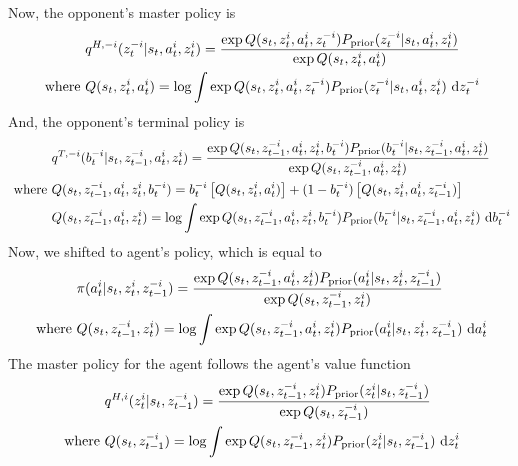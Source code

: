 Now, the opponent's master policy is 
\begin{equation}
\begin{aligned}
    &q^{H, -i}(z_t^{-i} | s_t, a^i_t, z^i_t) = \frac{\exp Q(s_t, z^i_t, a^{i}_t, z^{-i}_t) P_{\text{prior}}(z_t^{-i} | s_t, a^i_t, z^i_t)}{\exp Q(s_t, z^i_t, a^{i}_t)} \\
    \text{ where }& Q(s_t, z^i_t, a^{i}_t) = \log \int \exp Q(s_t, z^i_t, a^{i}_t, z^{-i}_t) P_{\text{prior}}(z_t^{-i} | s_t, a^i_t, z^i_t) \ \mathrm{d} z^{-i}_t
\end{aligned}
\end{equation}
And, the opponent's terminal policy is 
\begin{equation}
\begin{aligned}
    &q^{T,-i}(b^{-i}_t | s_t,  z^{-i}_{t-1}, a^i_t, z^i_t) = \frac{\exp Q(s_t,  z^{-i}_{t-1}, a^i_t, z^i_t, b^{-i}_t) P_{\text{prior}}(b^{-i}_t | s_t,  z^{-i}_{t-1}, a^i_t, z^i_t)}{\exp Q(s_t,  z^{-i}_{t-1}, a^i_t, z^i_t)} \\
    \text{ where }&Q(s_t,  z^{-i}_{t-1}, a^i_t, z^i_t, b^{-i}_t) = b^{-i}_t\left[ Q(s_t, z^i_t, a^{i}_t) \right] + (1-b^{-i}_t)\left[ Q(s_t, z^i_t, a^{i}_t, z^{-i}_{t-1}) \right] \\
    &Q(s_t,  z^{-i}_{t-1}, a^i_t, z^i_t) = \log \int \exp Q(s_t,  z^{-i}_{t-1}, a^i_t, z^i_t, b^{-i}_t) P_{\text{prior}}(b^{-i}_t | s_t,  z^{-i}_{t-1}, a^i_t, z^i_t) \ \mathrm{d} b^{-i}_t
\end{aligned}
\end{equation}
Now, we shifted to agent's policy, which is equal to 
\begin{equation}
\begin{aligned}
    &\pi(a^i_t | s_t, z^i_t, z^{-i}_{t-1}) = \frac{\exp Q(s_t,  z^{-i}_{t-1}, a^i_t, z^i_t) P_{\text{prior}}(a^i_t | s_t, z^i_t, z^{-i}_{t-1})}{\exp Q(s_t,  z^{-i}_{t-1}, z^i_t)} \\
    \text{ where }&Q(s_t,  z^{-i}_{t-1}, z^i_t) = \log \int \exp Q(s_t,  z^{-i}_{t-1}, a^i_t, z^i_t) P_{\text{prior}}(a^i_t | s_t, z^i_t, z^{-i}_{t-1}) \ \mathrm{d} a^i_t
\end{aligned}
\end{equation}
The master policy for the agent follows the agent's value function
\begin{equation}
\begin{aligned}
    &q^{H, i}(z_t^i | s_t, z^{-i}_{t-1}) = \frac{\exp Q(s_t,  z^{-i}_{t-1}, z^i_t) P_{\text{prior}}(z_t^i | s_t, z^{-i}_{t-1})}{\exp Q(s_t,  z^{-i}_{t-1})} \\
    \text{ where }&Q(s_t,  z^{-i}_{t-1}) = \log \int\exp Q(s_t,  z^{-i}_{t-1}, z^i_t) P_{\text{prior}}(z_t^i | s_t, z^{-i}_{t-1}) \ \mathrm{d} z_t^i
\end{aligned}
\end{equation}

